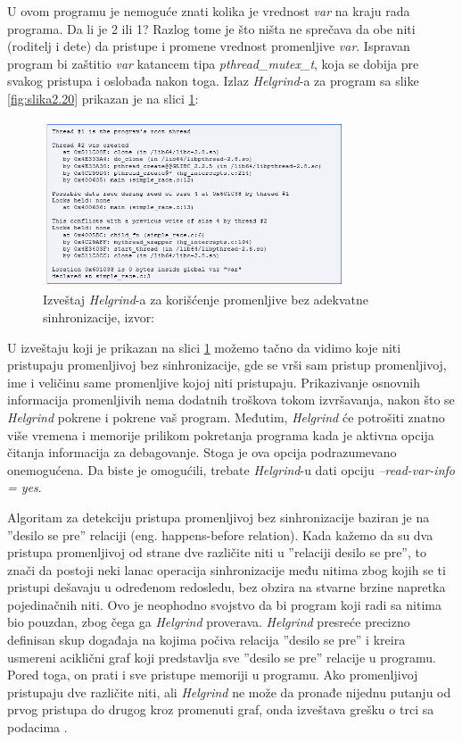 \documentclass[12pt,oneside]{memoir}
\theoremstyle{plain}
\theoremstyle{definition}
\begin{document}
U ovom programu je nemoguće znati kolika je vrednost \textit{var} na kraju rada programa. Da li je 2 ili 1? Razlog tome je što ništa ne sprečava da obe niti (roditelj i dete) da pristupe i promene vrednost promenljive \textit{var}. Ispravan program bi zaštitio \textit{var} katancem tipa \textit{pthread\_mutex\_t}, koja se dobija pre svakog pristupa i oslobađa nakon toga. Izlaz \textit{Helgrind}-a za program sa slike \ref{fig:slika2.20} prikazan je na slici \ref{fig:slika2.21}:
\begin{figure}[!ht]
  \centering
  \includegraphics[width=0.8\textwidth]{DataRaceReport.png}
  \caption{Izveštaj \textit{Helgrind}-a za korišćenje promenljive bez adekvatne sinhronizacije, izvor: \cite{Helgrind}}
  \label{fig:slika2.21}
\end{figure}

U izveštaju koji je prikazan na slici \ref{fig:slika2.21} možemo tačno da vidimo koje niti pristupaju promenljivoj bez sinhronizacije, gde se vrši sam pristup promenljivoj, ime i veličinu same promenljive kojoj niti pristupaju. Prikazivanje osnovnih informacija promenljivih nema dodatnih troškova tokom izvršavanja, nakon što se \textit{Helgrind} pokrene i pokrene vaš program. Međutim, \textit{Helgrind} će potrošiti znatno više vremena i memorije prilikom pokretanja programa kada je aktivna opcija čitanja informacija za debagovanje. Stoga je ova opcija podrazumevano onemogućena. Da biste je omogućili, trebate \textit{Helgrind}-u dati opciju \textit{--read-var-info = yes}.

Algoritam za detekciju pristupa promenljivoj bez sinhronizacije baziran je na ''desilo se pre'' relaciji (eng. happens-before relation). Kada kažemo da su dva pristupa promenljivoj od strane dve različite niti u ''relaciji desilo se pre'', to znači da postoji neki lanac operacija sinhronizacije među nitima zbog kojih se ti pristupi dešavaju u određenom redosledu, bez obzira na stvarne brzine napretka pojedinačnih niti. Ovo je neophodno svojstvo da bi program koji radi sa nitima bio pouzdan, zbog čega ga \textit{Helgrind} proverava. \textit{Helgrind} presreće precizno definisan skup događaja na kojima počiva relacija ''desilo se pre'' i kreira usmereni aciklični graf koji predstavlja sve ''desilo se pre'' relacije u programu. Pored toga, on prati i sve pristupe memoriji u programu. Ako promenljivoj pristupaju dve različite niti, ali \textit{Helgrind} ne može da pronađe nijednu putanju od prvog pristupa do drugog kroz promenuti graf, onda izveštava grešku o trci sa podacima \cite{Helgrind}.  
\end{document}
